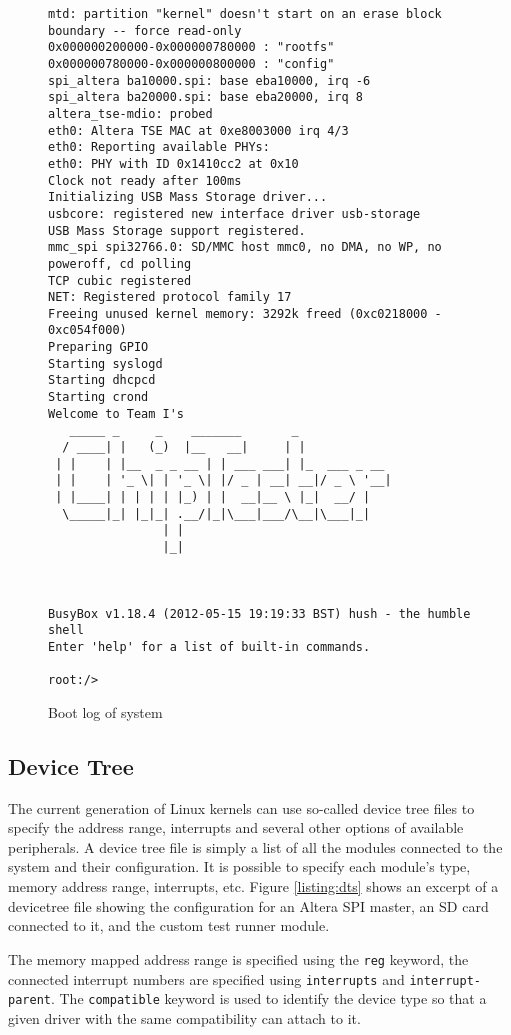 \begin{figure}[h!]
\begin{lstlisting}
mtd: partition "kernel" doesn't start on an erase block boundary -- force read-only
0x000000200000-0x000000780000 : "rootfs"
0x000000780000-0x000000800000 : "config"
spi_altera ba10000.spi: base eba10000, irq -6
spi_altera ba20000.spi: base eba20000, irq 8
altera_tse-mdio: probed
eth0: Altera TSE MAC at 0xe8003000 irq 4/3
eth0: Reporting available PHYs:
eth0: PHY with ID 0x1410cc2 at 0x10
Clock not ready after 100ms
Initializing USB Mass Storage driver...
usbcore: registered new interface driver usb-storage
USB Mass Storage support registered.
mmc_spi spi32766.0: SD/MMC host mmc0, no DMA, no WP, no poweroff, cd polling
TCP cubic registered
NET: Registered protocol family 17
Freeing unused kernel memory: 3292k freed (0xc0218000 - 0xc054f000)
Preparing GPIO
Starting syslogd
Starting dhcpcd
Starting crond
Welcome to Team I's
   _____ _     _    _______       _
  / ____| |   (_)  |__   __|     | |
 | |    | |__  _ _ __ | | ___ ___| |_  ___ _ __
 | |    | '_ \| | '_ \| |/ _ | __| __|/ _ \ '__|
 | |____| | | | | |_) | |  __|__ \ |_|  __/ |
  \_____|_| |_|_| .__/|_|\___|___/\__|\___|_|
                | |
                |_|



BusyBox v1.18.4 (2012-05-15 19:19:33 BST) hush - the humble shell
Enter 'help' for a list of built-in commands.

root:/>
\end{lstlisting}
\caption{Boot log of system}
\label{listing:bootlog}
\end{figure}


\subsection{Device Tree}
The current generation of Linux kernels can use so-called device tree files to specify the address range,
interrupts and several other options of available peripherals. A device tree file is simply a list
of all the modules connected to the system and their configuration. It is possible to specify each module's
type, memory address range, interrupts, etc. Figure \ref{listing:dts} shows an excerpt of a devicetree file showing the
configuration for an Altera SPI master, an SD card connected to it, and the custom test runner module.

The memory mapped address range is specified using the \texttt{reg} keyword, the connected interrupt numbers
are specified using \texttt{interrupts} and \texttt{interrupt-parent}. The \texttt{compatible} keyword is
used to identify the device type so that a given driver with the same compatibility can attach to it.

